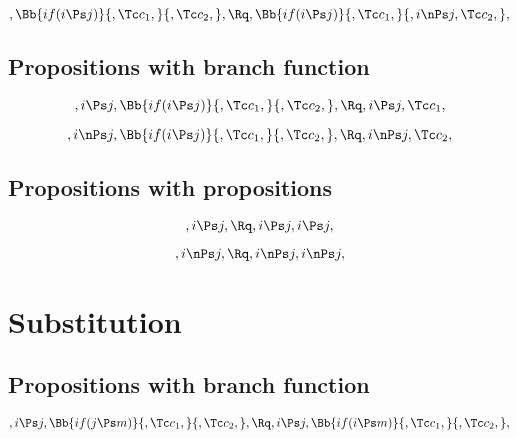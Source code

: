\[, \Bb{if(i \Ps j)}{,\Tc c_1,}{,\Tc c_2,}, \Rq , \Bb{if(i \Ps j)}{,\Tc c_1,}{,i \nPs j,\Tc c_2,},\]

\bigskip
\bigskip
\bigskip
\bigskip
\subsection{Propositions with branch function}
\[,i \Ps j, \Bb{if(i \Ps j)}{,\Tc c_1,}{,\Tc c_2,}, \Rq , i \Ps j, \Tc c_1,\]

\[,i \nPs j, \Bb{if(i \Ps j)}{,\Tc c_1,}{,\Tc c_2,}, \Rq , i \nPs j, \Tc c_2,\]
\bigskip
\bigskip
\bigskip
\bigskip
\subsection{Propositions with propositions}
\[,i \Ps j, \Rq , i \Ps j, i \Ps j,\]

\[,i \nPs j, \Rq , i \nPs j, i \nPs j,\]


\bigskip
\bigskip
\bigskip
\bigskip
\section{ Substitution}
\subsection{Propositions with branch function}
\[,i \Ps j, \Bb{if(j \Ps m)}{,\Tc c_1,}{,\Tc c_2,}, \Rq ,i \Ps j, \Bb{if(i \Ps m)}{,\Tc c_1,}{,\Tc c_2,}, \]

